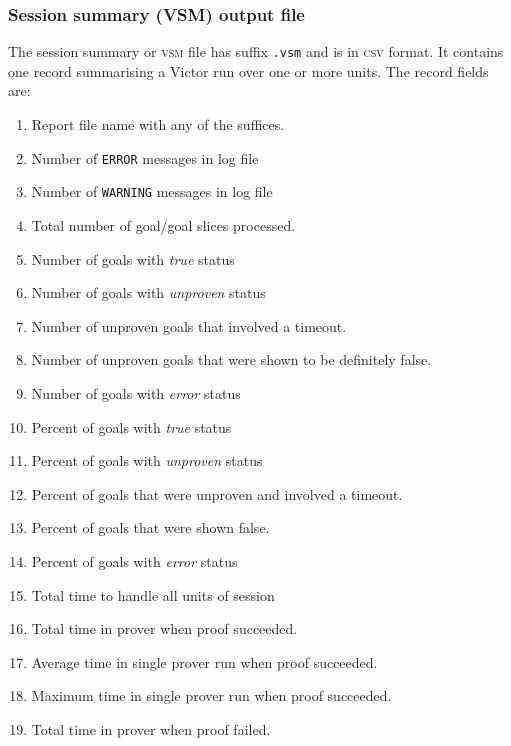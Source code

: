 \documentclass[12pt,fleqn]{article}
\newcommand{\sessionsumfile}{\textsc{vsm}}
\newcommand{\csv}{\textsc{csv}}
\begin{document}
\subsubsection{Session summary (VSM) output file}
The session summary or \sessionsumfile{} file has suffix \texttt{.vsm} and is
in \csv{} format.  It contains one record summarising a Victor run over one
or more units.
The record fields are:
\begin{enumerate}
\item Report file name with any of the suffices.

\item Number of \texttt{ERROR} messages in log file
\item Number of \texttt{WARNING} messages in log file

\item Total number of goal/goal slices processed.
\item Number of goals with \emph{true} status
\item Number of goals with \emph{unproven} status
\item Number of unproven goals that involved a timeout.
\item Number of unproven goals that were shown to be definitely false.
\item Number of goals with \emph{error} status

\item Percent of goals with \emph{true} status
\item Percent of goals with \emph{unproven} status
\item Percent of goals that were unproven and involved a timeout.
\item Percent of goals that were shown false.
\item Percent of goals with \emph{error} status

\item Total time to handle all units of session
\item Total time in prover when proof succeeded.
\item Average time in single prover run when proof succeeded.
\item Maximum  time in single prover run when proof succeeded.
\item Total time in prover when proof failed.


\end{enumerate}
\end{document}
